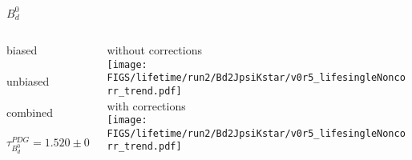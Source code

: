 \begin{frame}{$B_d^0$}
  
  \begin{columns}
  
  \begin{column}{0.45\textwidth}
  {\color{scqorange}biased} \\[2mm]
  \resizebox{\textwidth}{!}{}\\[5mm]
  {\color{scqred}unbiased} \\[2mm]
  \resizebox{\textwidth}{!}{}\\[5mm]
  {\color{scqgreen}combined} \\[2mm]
  \resizebox{\textwidth}{!}{}\\
  \begin{equation*}
    \tau_{B_d^0}^{PDG} = 1.520 \pm 0.004
  \end{equation*}
  \end{column}

  \begin{column}{0.45\textwidth}
  \footnotesize
  {without corrections} \\[2mm]
  \texttt{[image: \\FIGS/lifetime/run2/Bd2JpsiKstar/v0r5\_lifesingleNoncorr\_trend.pdf]}\\[3mm]
  {with corrections} \\[2mm]
  \texttt{[image: \\FIGS/lifetime/run2/Bd2JpsiKstar/v0r5\_lifesingleNoncorr\_trend.pdf]}
  \end{column}
  
  \end{columns}

\end{frame}



